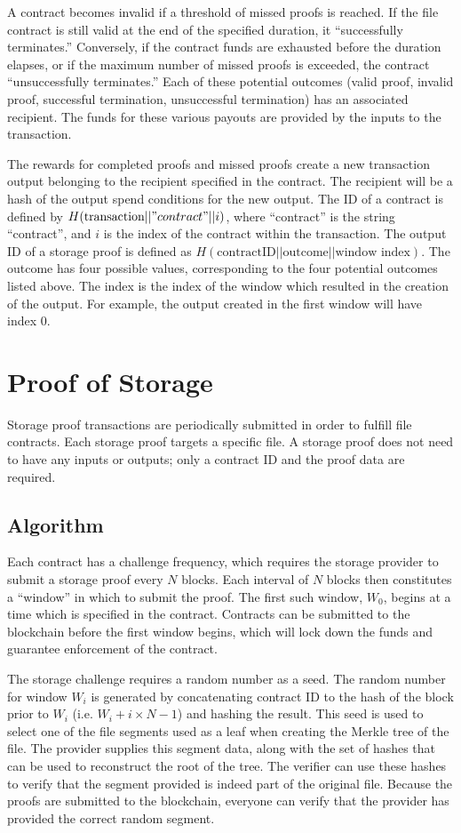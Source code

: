 \documentclass[twocolumn]{article}
\begin{document}
A contract becomes invalid if a threshold of missed proofs is reached.
If the file contract is still valid at the end of the specified duration, it ``successfully terminates.''
Conversely, if the contract funds are exhausted before the duration elapses, or if the maximum number of missed proofs is exceeded, the contract ``unsuccessfully terminates.''
Each of these potential outcomes (valid proof, invalid proof, successful termination, unsuccessful termination) has an associated recipient.
The funds for these various payouts are provided by the inputs to the transaction.

The rewards for completed proofs and missed proofs create a new transaction output belonging to the recipient specified in the contract.
The recipient will be a hash of the output spend conditions for the new output.
The ID of a contract is defined by $H(\text{transaction} || "contract" || i)$, where ``contract'' is the string ``contract'', and $i$ is the index of the contract within the transaction.
The output ID of a storage proof is defined as $H(\text{contractID} || \text{outcome} || \text{window index})$.
The outcome has four possible values, corresponding to the four potential outcomes listed above.
The index is the index of the window which resulted in the creation of the output.
For example, the output created in the first window will have index 0.

\section{Proof of Storage}
\label{sec:storage}
Storage proof transactions are periodically submitted in order to fulfill file contracts.
Each storage proof targets a specific file.
A storage proof does not need to have any inputs or outputs; only a contract ID and the proof data are required.

\subsection{Algorithm}
Each contract has a challenge frequency, which requires the storage provider to submit a storage proof every $N$ blocks.
Each interval of $N$ blocks then constitutes a ``window'' in which to submit the proof.
The first such window, $W_0$, begins at a time which is specified in the contract.
Contracts can be submitted to the blockchain before the first window begins, which will lock down the funds and guarantee enforcement of the contract.

The storage challenge requires a random number as a seed.
The random number for window $W_i$ is generated by concatenating contract ID to the hash of the block prior to $W_i$ (i.e. $W_i + i \times N - 1$) and hashing the result.
This seed is used to select one of the file segments used as a leaf when creating the Merkle tree of the file.
The provider supplies this segment data, along with the set of hashes that can be used to reconstruct the root of the tree.
The verifier can use these hashes to verify that the segment provided is indeed part of the original file.
Because the proofs are submitted to the blockchain, everyone can verify that the provider has provided the correct random segment.
\end{document}
